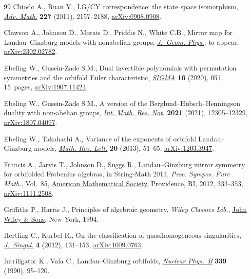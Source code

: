 \begin{thebibliography}{99}
Chiodo A., Ruan Y., L{G}/{CY} correspondence: the state space isomorphism,
 \href{https://doi.org/10.1016/j.aim.2011.04.011}{\textit{Adv. Math.}} \textbf{227} (2011), 2157--2188, \href{https://arxiv.org/abs/0908.0908}{arXiv:0908.0908}.

Clawson A., Johnson D., Morais D., Priddis N., White C.B., Mirror map for
 {L}andau--{G}inzburg models with nonabelian groups, \href{https://doi.org/10.1016/j.geomphys.2024.105161}{\textit{J.~Geom. Phys.}},
 {t}o appear, \href{https://arxiv.org/abs/2302.02782}{arXiv:2302.02782}.

Ebeling W., Gusein-Zade S.M., Dual invertible polynomials with permutation
 symmetries and the orbifold {E}uler characteristic, \href{https://doi.org/10.3842/SIGMA.2020.051}{\textit{SIGMA}}
 \textbf{16} (2020), 051, 15~pages, \href{https://arxiv.org/abs/1907.11421}{arXiv:1907.11421}.

Ebeling W., Gusein-Zade S.M., A version of the
 {B}erglund--{H}\"ubsch--{H}enningson duality with non-abelian groups,
 \href{https://doi.org/10.1093/imrn/rnz167}{\textit{Int. Math. Res. Not.}} \textbf{2021} (2021), 12305--12329,
 \href{https://arxiv.org/abs/1807.04097}{arXiv:1807.04097}.

Ebeling W., Takahashi A., Variance of the exponents of orbifold
 {L}andau--{G}inzburg models, \href{https://doi.org/10.4310/MRL.2013.v20.n1.a5}{\textit{Math. Res. Lett.}} \textbf{20} (2013),
 51--65, \href{https://arxiv.org/abs/1203.3947}{arXiv:1203.3947}.

Francis A., Jarvis T., Johnson D., Suggs R., Landau--{G}inzburg mirror symmetry
 for orbifolded {F}robenius algebras, in String-{M}ath 2011, \textit{Proc.
 Sympos. Pure Math.}, Vol.~85, \href{https://doi.org/10.1090/pspum/085/1389}{American Mathematical Society}, Providence, RI,
 2012, 333--353, \href{https://arxiv.org/abs/1111.2508}{arXiv:1111.2508}.

Griffiths P., Harris J., Principles of algebraic geometry, \textit{Wiley Classics Lib.},
 \href{https://doi.org/10.1002/9781118032527}{John Wiley \& Sons}, New York, 1994.

Hertling C., Kurbel R., On the classification of quasihomogeneous
 singularities, \href{https://doi.org/10.5427/jsing.2012.4h}{\textit{J.~Singul.}} \textbf{4} (2012), 131--153,
 \href{https://arxiv.org/abs/1009.0763}{arXiv:1009.0763}.

Intriligator K., Vafa C., Landau--{G}inzburg orbifolds, \href{https://doi.org/10.1016/0550-3213(90)90535-L}{\textit{Nuclear
 Phys.~B}} \textbf{339} (1990), 95--120.


\end{thebibliography}
